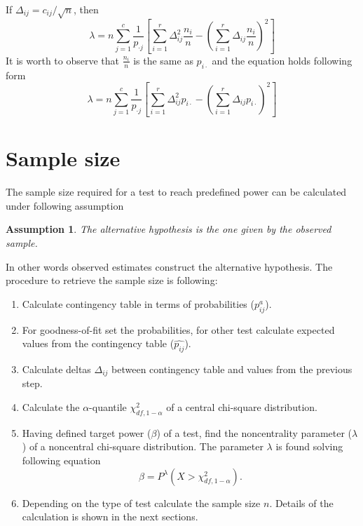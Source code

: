 \documentclass{article}
\newtheorem{assumption}{Assumption}
\begin{document}
If $\Delta_{ij} = c_{ij}/\sqrt{n}$, then 
\begin{equation}
    \lambda = n\sum_{j=1}^{c}\frac{1}{p_{\cdot j}}\left[ \sum_{i=1}^{r} \Delta_{ij}^2 \frac{n_i}{n} -  \left(\sum_{i=1}^{r} \Delta_{ij} \frac{n_i}{n}\right)^2  \right]
\end{equation}
It is worth to observe that $\frac{n_i}{n}$ is the same as $p_{i\cdot}$ and the equation holds following form
\begin{equation}\label{homogeneity_lambda}
    \lambda = n\sum_{j=1}^{c}\frac{1}{p_{\cdot j}}\left[ \sum_{i=1}^{r} \Delta_{ij}^2 p_{i\cdot} -  \left(\sum_{i=1}^{r} \Delta_{ij} p_{i\cdot}\right)^2  \right]
\end{equation}

\section{Sample size}
The sample size required for a test to reach predefined power can be calculated
under following assumption 

\begin{assumption}
The alternative hypothesis is the one given by the observed sample. 
\end{assumption} 
In other words observed estimates construct the alternative hypothesis. The 
procedure to retrieve the sample size is following:

\begin{enumerate}
    \item Calculate contingency table in terms of probabilities ($p^a_{ij}$).
    \item For goodness-of-fit set the probabilities, for other test calculate expected values from the contingency table ($\widehat{p_{ij}}$).
    \item Calculate deltas $\Delta_{ij}$ between contingency table and values from the previous step.
    \item Calculate the $\alpha$-quantile $\chi^2_{df,1-\alpha}$ of a central chi-square distribution.
    \item Having defined target power ($\beta$) of a test, find the noncentrality parameter ($\lambda$) of a noncentral chi-square distribution. 
    The parameter $\lambda$ is found solving following equation
    \begin{equation}
        \beta = P^\lambda\left(X > \chi^2_{df,1-\alpha} \right).
    \end{equation}
    \item Depending on the type of test calculate the sample size $n$. Details of the calculation is shown in the next sections.
\end{enumerate}
\end{document}
